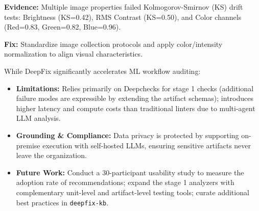 \documentclass[final,t]{beamer}
\begin{document}
\begin{frame}[fragile]
\begin{columns}[T]
\begin{column}{0.24\textwidth}
\begin{posterblock}
  \vspace{4mm}

  \begin{tcolorbox}[
    enhanced, colback=white, colframe=SeverityHigh,
    boxrule=2pt, arc=4pt, left=8mm, right=8mm, top=5mm, bottom=5mm,
    title={\color{white}\fontsize{24}{28}\selectfont\bfseries HIGH --- Image Acquisition Drift},
    colbacktitle=SeverityHigh,
  ]
    \fontsize{22}{26}\selectfont
    \textbf{Evidence:} Multiple image properties failed Kolmogorov-Smirnov (KS) drift tests: Brightness (KS=0.42), RMS Contrast (KS=0.50), and Color channels (Red=0.83, Green=0.82, Blue=0.96).

    \vspace{3mm}
    \textcolor{TUMBlue}{\textbf{Fix:}} Standardize image collection protocols and apply color/intensity normalization to align visual characteristics.
  \end{tcolorbox}
\end{posterblock}

\vspace{10mm}

\begin{posterblock}
  \fontsize{20}{25}\selectfont\color{BodyText}\justifying
  While DeepFix significantly accelerates ML workflow auditing:
  \vspace{3mm}
  \begin{itemize}[leftmargin=6mm, itemsep=2.5mm, label={\textcolor{TUMAccent}{\textbullet}}]
    \item \textbf{Limitations:} Relies primarily on Deepchecks for stage 1 checks (additional failure modes are expressible by extending the artifact schemas); introduces higher latency and compute costs than traditional linters due to multi-agent LLM analysis.
    \item \textbf{Grounding \& Compliance:} Data privacy is protected by supporting on-premise execution with self-hosted LLMs, ensuring sensitive artifacts never leave the organization.
    \item \textbf{Future Work:} Conduct a 30-participant usability study to measure the adoption rate of recommendations; expand the stage 1 analyzers with complementary unit-level and artifact-level testing tools; curate additional best practices in \texttt{deepfix-kb}.
  \end{itemize}
\end{posterblock}

\vspace{10mm}


\end{column}
\end{columns}
\end{frame}
\end{document}
